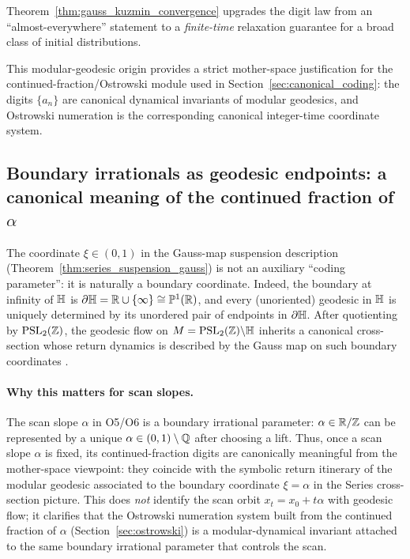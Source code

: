 \begin{remark}
Theorem~\ref{thm:gauss_kuzmin_convergence} upgrades the digit law from an ``almost-everywhere'' statement to a \emph{finite-time} relaxation guarantee for a broad class of initial distributions.
\end{remark}

\begin{remark}
This modular-geodesic origin provides a strict mother-space justification for the continued-fraction/Ostrowski module used in Section~\ref{sec:canonical_coding}: the digits $\{a_n\}$ are canonical dynamical invariants of modular geodesics, and Ostrowski numeration is the corresponding canonical integer-time coordinate system.
\end{remark}

\subsection{Boundary irrationals as geodesic endpoints: a canonical meaning of the continued fraction of \texorpdfstring{$\alpha$}{alpha}}
\label{sec:alpha_geodesic_endpoint}

The coordinate $\xi\in(0,1)$ in the Gauss-map suspension description (Theorem~\ref{thm:series_suspension_gauss}) is not an auxiliary ``coding parameter'': it is naturally a boundary coordinate.
Indeed, the boundary at infinity of $\mathbb{H}$ is $\partial\mathbb{H}=\mathbb{R}\cup\{\infty\}\cong \mathbb{P}^1(\mathbb{R})$, and every (unoriented) geodesic in $\mathbb{H}$ is uniquely determined by its unordered pair of endpoints in $\partial\mathbb{H}$.
After quotienting by $\mathrm{PSL}_2(\mathbb{Z})$, the geodesic flow on $M=\mathrm{PSL}_2(\mathbb{Z})\backslash\mathbb{H}$ inherits a canonical cross-section whose return dynamics is described by the Gauss map on such boundary coordinates \cite{Series1985,KatokHasselblatt1995}.

\paragraph{Why this matters for scan slopes.}
The scan slope $\alpha$ in O5/O6 is a boundary irrational parameter: $\alpha\in\mathbb{R}/\mathbb{Z}$ can be represented by a unique $\alpha\in(0,1)\setminus\mathbb{Q}$ after choosing a lift.
Thus, once a scan slope $\alpha$ is fixed, its continued-fraction digits are canonically meaningful from the mother-space viewpoint: they coincide with the symbolic return itinerary of the modular geodesic associated to the boundary coordinate $\xi=\alpha$ in the Series cross-section picture.
This does \emph{not} identify the scan orbit $x_t=x_0+t\alpha$ with geodesic flow; it clarifies that the Ostrowski numeration system built from the continued fraction of $\alpha$ (Section~\ref{sec:ostrowski}) is a modular-dynamical invariant attached to the same boundary irrational parameter that controls the scan.

